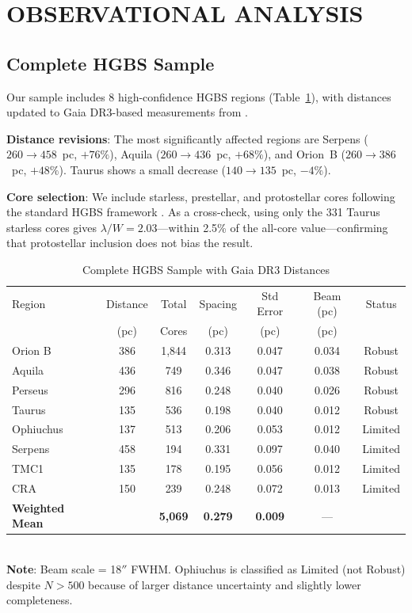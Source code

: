 \documentclass[twoside,twocolumn]{mnras}
\begin{document}
\section{OBSERVATIONAL ANALYSIS}

\subsection{Complete HGBS Sample}
\label{sec:sample}

Our sample includes 8 high-confidence HGBS regions (Table~\ref{tab:sample}), with
distances updated to Gaia DR3-based measurements from \citet{Zhang2023}.

\textbf{Distance revisions}: The most significantly affected regions are Serpens
($260 \to 458$~pc, $+76\%$), Aquila ($260 \to 436$~pc, $+68\%$), and Orion~B
($260 \to 386$~pc, $+48\%$). Taurus shows a small decrease ($140 \to 135$~pc, $-4\%$).

\textbf{Core selection}: We include starless, prestellar, and protostellar cores following the standard HGBS framework \citep{Konyves2015, Konyves2020}. As a cross-check, using only the 331 Taurus starless cores gives $\lambda/W = 2.03$---within 2.5\% of the all-core value---confirming that protostellar inclusion does not bias the result.

\begin{table}
\caption{Complete HGBS Sample with Gaia DR3 Distances}
\label{tab:sample}
\begin{tabular}{lcccccc}
\toprule
Region & Distance & Total & Spacing & Std Error & Beam (pc) & Status \\
       & (pc)   & Cores & (pc)   & (pc)      & (pc) & \\
\midrule
Orion B  & 386 & 1,844 & 0.313 & 0.047 & 0.034 & Robust \\
Aquila   & 436 & 749   & 0.346 & 0.047 & 0.038 & Robust \\
Perseus  & 296 & 816   & 0.248 & 0.040 & 0.026 & Robust \\
Taurus   & 135 & 536   & 0.198 & 0.040 & 0.012 & Robust \\
Ophiuchus& 137 & 513   & 0.206 & 0.053 & 0.012 & Limited \\
Serpens  & 458 & 194   & 0.331 & 0.097 & 0.040 & Limited \\
TMC1     & 135 & 178   & 0.195 & 0.056 & 0.012 & Limited \\
CRA      & 150 & 239   & 0.248 & 0.072 & 0.013 & Limited \\
\midrule
\textbf{Weighted Mean} &  & \textbf{5,069} & \textbf{0.279} & \textbf{0.009} & --- &  \\
\bottomrule
\end{tabular}
\\ \footnotesize \textbf{Note}: Beam scale = 18$''$ FWHM. Ophiuchus is classified as Limited (not Robust) despite $N>500$ because of larger distance uncertainty and slightly lower completeness.
\end{table}
\end{document}
